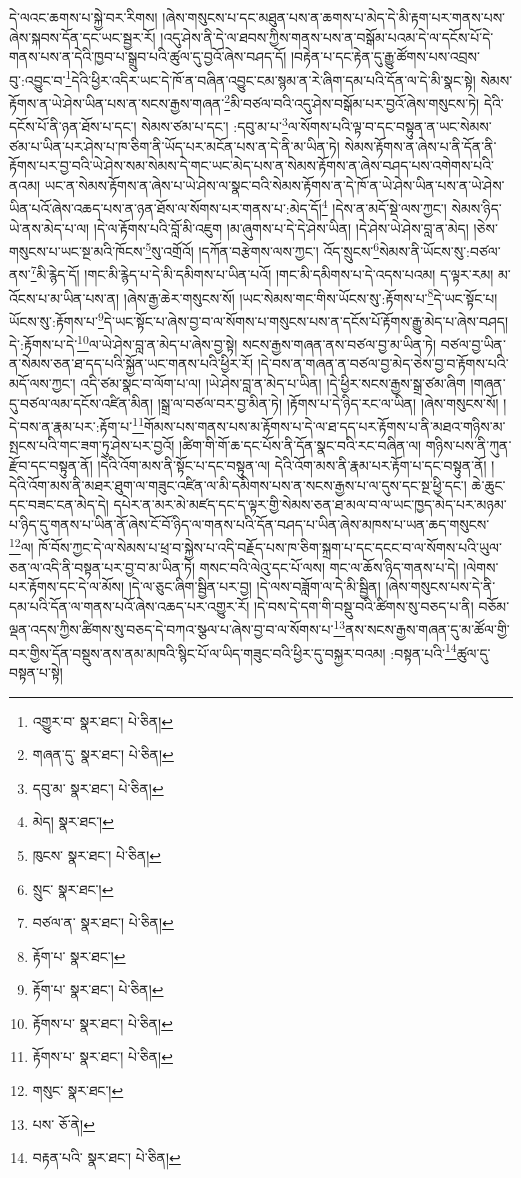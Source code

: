དེ་ལའང་ཆགས་པ་སྐྱེ་བར་རིགས། །ཞེས་གསུངས་པ་དང་མཐུན་པས་ན་ཆགས་པ་མེད་དེ་མི་རྟག་པར་གནས་པས་ཞེས་སྐབས་དོན་དང་ཡང་སྦྱར་རོ། །འདུ་ཤེས་ནི་དེ་ལ་ཐབས་ཀྱིས་གནས་པས་ན་བསྒོམ་པའམ་དེ་ལ་དངོས་པོ་དེ་གནས་པས་ན་དེའི་ཁྱབ་པ་སྒྲུབ་པའི་ཚུལ་དུ་བྱའོ་ཞེས་བཤད་དོ། །བརྟེན་པ་དང་རྟེན་དུ་རྒྱུ་ཚོགས་པས་འབྲས་བུ་:འབྱུང་བ་\footnote{འགྱུར་བ་  སྣར་ཐང་།  པེ་ཅིན། }དེའི་ཕྱིར་འདིར་ཡང་དེ་ཁོ་ན་བཞིན་འབྱུང་ངམ་སྙམ་ན་རེ་ཞིག་དམ་པའི་དོན་ལ་དེ་མི་སྣང་སྟེ། སེམས་རྟོགས་ན་ཡེ་ཤེས་ཡིན་པས་ན་སངས་རྒྱས་གཞན་\footnote{གཞན་དུ་  སྣར་ཐང་།  པེ་ཅིན། }མི་བཙལ་བའི་འདུ་ཤེས་བསྒོམ་པར་བྱའོ་ཞེས་གསུངས་ཏེ། དེའི་དངོས་པོ་ནི་ཉན་ཐོས་པ་དང་། སེམས་ཙམ་པ་དང་། :དབུ་མ་པ་\footnote{དབུ་མ་  སྣར་ཐང་།  པེ་ཅིན། }ལ་སོགས་པའི་ལྟ་བ་དང་བསྟུན་ན་ཡང་སེམས་ཙམ་པ་ཡིན་པར་ཤེས་པ་ཁ་ཅིག་ནི་ཡོད་པར་མངོན་པས་ན་དེ་ནི་མ་ཡིན་ཏེ། སེམས་རྟོགས་ན་ཞེས་པ་ནི་དོན་ནི་རྟོགས་པར་བྱ་བའི་ཡེ་ཤེས་སམ་སེམས་དེ་གང་ཡང་མེད་པས་ན་སེམས་རྟོགས་ན་ཞེས་བཤད་པས་འགེགས་པའི་ནའམ། ཡང་ན་སེམས་རྟོགས་ན་ཞེས་པ་ཡེ་ཤེས་ལ་སྣང་བའི་སེམས་རྟོགས་ན་དེ་ཁོ་ན་ཡེ་ཤེས་ཡིན་པས་ན་ཡེ་ཤེས་ཡིན་པའོ་ཞེས་འཆད་པས་ན་ཉན་ཐོས་ལ་སོགས་པར་གནས་པ་:མེད་དོ།\footnote{མེད།  སྣར་ཐང་། } །དེས་ན་མདོ་སྡེ་ལས་ཀྱང་། སེམས་ཉིད་ཡེ་ནས་མེད་པ་ལ། །དེ་ལ་རྟོགས་པའི་བློ་མི་འཇུག །མ་ཞུགས་པ་དེ་དེ་ཤེས་ཡིན། །དེ་ཤེས་ཡེ་ཤེས་བླ་ན་མེད། །ཅེས་གསུངས་པ་ཡང་སྔ་མའི་ཁོངས་\footnote{ཁུངས་  སྣར་ཐང་།  པེ་ཅིན། }སུ་འགྲོའོ། །དཀོན་བརྩེགས་ལས་ཀྱང་། འོད་སྲུངས་\footnote{སྲུང་  སྣར་ཐང་། }སེམས་ནི་ཡོངས་སུ་:བཙལ་ནས་\footnote{བཙལ་ན་  སྣར་ཐང་།  པེ་ཅིན། }མི་རྙེད་དོ། །གང་མི་རྙེད་པ་དེ་མི་དམིགས་པ་ཡིན་པའོ། །གང་མི་དམིགས་པ་དེ་འདས་པའམ། ད་ལྟར་རམ། མ་འོངས་པ་མ་ཡིན་པས་ན། །ཞེས་རྒྱ་ཆེར་གསུངས་སོ། །ཡང་སེམས་གང་གིས་ཡོངས་སུ་:རྟོགས་པ་\footnote{རྟོག་པ་  སྣར་ཐང་། }དེ་ཡང་སྟོང་པ། ཡོངས་སུ་:རྟོགས་པ་\footnote{རྟོག་པ་  སྣར་ཐང་།  པེ་ཅིན། }དེ་ཡང་སྟོང་པ་ཞེས་བྱ་བ་ལ་སོགས་པ་གསུངས་པས་ན་དངོས་པོ་རྟོགས་རྒྱུ་མེད་པ་ཞེས་བཤད། དེ་:རྟོགས་པ་དེ་\footnote{རྟོགས་པ་  སྣར་ཐང་།  པེ་ཅིན། }ལ་ཡེ་ཤེས་བླ་ན་མེད་པ་ཞེས་བྱ་སྟེ། སངས་རྒྱས་གཞན་ནས་བཙལ་བྱ་མ་ཡིན་ཏེ། བཙལ་བྱ་ཡིན་ན་སེམས་ཅན་ཐ་དད་པའི་སྐྱོན་ཡང་གནས་པའི་ཕྱིར་རོ། །དེ་བས་ན་གཞན་ན་བཙལ་བྱ་མེད་ཅེས་བྱ་བ་རྟོགས་པའི་མདོ་ལས་ཀྱང་། འདི་ཙམ་སྣང་བ་ལོག་པ་ལ། །ཡེ་ཤེས་བླ་ན་མེད་པ་ཡིན། །དེ་ཕྱིར་སངས་རྒྱས་སྒྲ་ཙམ་ཞིག །གཞན་དུ་བཙལ་ལམ་དངོས་འཛིན་མིན། །སྒྲ་ལ་བཙལ་བར་བྱ་མིན་ཏེ། །རྟོགས་པ་དེ་ཉིད་རང་ལ་ཡིན། །ཞེས་གསུངས་སོ། །དེ་བས་ན་རྣམ་པར་:རྟོག་པ་\footnote{རྟོགས་པ་  སྣར་ཐང་།  པེ་ཅིན། }གོམས་པས་གནས་པས་མ་རྟོགས་པ་དེ་ལ་ཐ་དད་པར་རྟོགས་པ་ནི་མཐའ་གཉིས་མ་སྤངས་པའི་གང་ཟག་ཏུ་ཤེས་པར་བྱའོ། །ཚིག་གི་གོ་ཆ་དང་པོས་ནི་དོན་སྣང་བའི་རང་བཞིན་ལ། གཉིས་པས་ནི་ཀུན་རྫོབ་དང་བསྟུན་ནོ། །དེའི་འོག་མས་ནི་སྟོང་པ་དང་བསྟུན་ལ། དེའི་འོག་མས་ནི་རྣམ་པར་རྟོག་པ་དང་བསྟུན་ནོ། །དེའི་འོག་མས་ནི་མཐར་ཐུག་ལ་གཟུང་འཛིན་ལ་མི་དམིགས་པས་ན་སངས་རྒྱས་པ་ལ་དུས་དང་སྔ་ཕྱི་དང་། ཆེ་ཆུང་དང་བཟང་ངན་མེད་དེ། དཔེར་ན་མར་མེ་མཛད་དང་ད་ལྟར་གྱི་སེམས་ཅན་ཐ་མལ་བ་ལ་ཡང་ཁྱད་མེད་པར་མཉམ་པ་ཉིད་དུ་གནས་པ་ཡིན་ནོ་ཞེས་ངོ་བོ་ཉིད་ལ་གནས་པའི་དོན་བཤད་པ་ཡིན་ཞེས་མཁས་པ་ཡན་ཆད་གསུངས་\footnote{གསུང་  སྣར་ཐང་། }ལ། ཁོ་བོས་ཀྱང་དེ་ལ་སེམས་པ་ཕྲ་བ་སྐྱེས་པ་འདི་བརྗོད་པས་ཁ་ཅིག་སྐྲག་པ་དང་དངང་བ་ལ་སོགས་པའི་ཡུལ་ཅན་ལ་འདི་ནི་བསྟན་པར་བྱ་བ་མ་ཡིན་ཏེ། གསང་བའི་ལེའུ་དང་པོ་ལས། གང་ལ་ཆོས་ཉིད་གནས་པ་དེ། །ལེགས་པར་རྟོགས་དང་དེ་ལ་མོས། །དེ་ལ་ཅུང་ཞིག་སྦྱིན་པར་བྱ། །དེ་ལས་བཟློག་ལ་དེ་མི་སྦྱིན། །ཞེས་གསུངས་པས་དེ་ནི་དམ་པའི་དོན་ལ་གནས་པའོ་ཞེས་འཆད་པར་འགྱུར་རོ། །དེ་བས་དེ་དག་གི་བསྡུ་བའི་ཚིགས་སུ་བཅད་པ་ནི། བཅོམ་ལྡན་འདས་ཀྱིས་ཚིགས་སུ་བཅད་དེ་བཀའ་སྩལ་པ་ཞེས་བྱ་བ་ལ་སོགས་པ་\footnote{པས་  ཅོ་ནེ། }ནས་སངས་རྒྱས་གཞན་དུ་མ་ཚོལ་གྱི་བར་གྱིས་དོན་བསྡུས་ནས་ནམ་མཁའི་སྙིང་པོ་ལ་ཡིད་གཟུང་བའི་ཕྱིར་དུ་བསྐྱར་བའམ། :བསྟན་པའི་\footnote{བརྟན་པའི་  སྣར་ཐང་།  པེ་ཅིན། }ཚུལ་དུ་བསྟན་པ་སྟེ། 